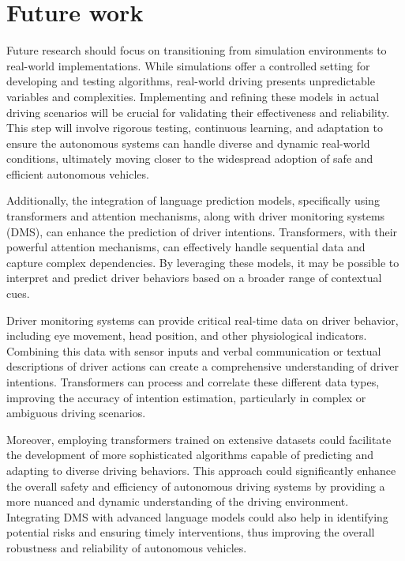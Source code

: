 \section{Future work}
Future research should focus on transitioning from simulation environments to real-world implementations. While simulations offer a controlled setting for developing and testing algorithms, real-world driving presents unpredictable variables and complexities. Implementing and refining these models in actual driving scenarios will be crucial for validating their effectiveness and reliability. This step will involve rigorous testing, continuous learning, and adaptation to ensure the autonomous systems can handle diverse and dynamic real-world conditions, ultimately moving closer to the widespread adoption of safe and efficient autonomous vehicles.

Additionally, the integration of language prediction models, specifically using transformers and attention mechanisms, along with driver monitoring systems (DMS), can enhance the prediction of driver intentions. Transformers, with their powerful attention mechanisms, can effectively handle sequential data and capture complex dependencies. By leveraging these models, it may be possible to interpret and predict driver behaviors based on a broader range of contextual cues.

Driver monitoring systems can provide critical real-time data on driver behavior, including eye movement, head position, and other physiological indicators. Combining this data with sensor inputs and verbal communication or textual descriptions of driver actions can create a comprehensive understanding of driver intentions. Transformers can process and correlate these different data types, improving the accuracy of intention estimation, particularly in complex or ambiguous driving scenarios.

Moreover, employing transformers trained on extensive datasets could facilitate the development of more sophisticated algorithms capable of predicting and adapting to diverse driving behaviors. This approach could significantly enhance the overall safety and efficiency of autonomous driving systems by providing a more nuanced and dynamic understanding of the driving environment. Integrating DMS with advanced language models could also help in identifying potential risks and ensuring timely interventions, thus improving the overall robustness and reliability of autonomous vehicles.